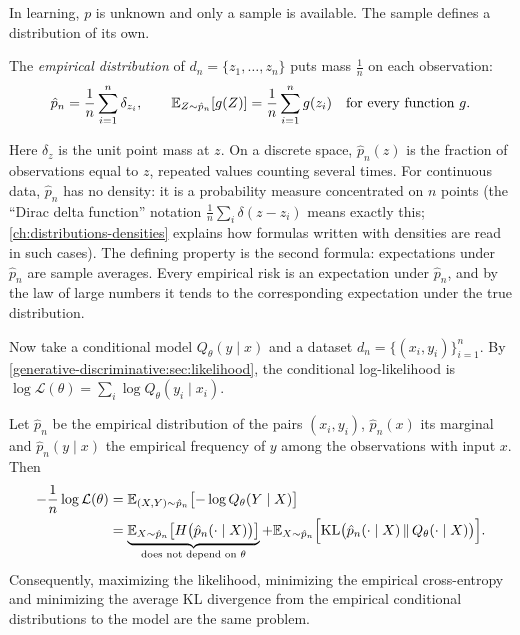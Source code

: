 \begin{notechapter}
In learning, $p$ is unknown and only a sample is available. The sample defines a
distribution of its own.

\begin{definition}\label{cross-entropy:def:empirical}
The \emph{empirical distribution} of $d_n = \{z_1,\dots,z_n\}$ puts mass $\frac1n$ on
each observation:
\[
  \hat p_n = \frac1n\sum_{i=1}^n\delta_{z_i},\qquad
  \mathbb{E}_{Z\sim\hat p_n}[g(Z)] = \frac1n\sum_{i=1}^ng(z_i)\quad\text{for every function }g.
\]
\end{definition}

Here $\delta_z$ is the unit point mass at $z$. On a discrete space, $\hat p_n(z)$ is
the fraction of observations equal to $z$, repeated values counting several times.
For continuous data, $\hat p_n$ has no density: it is a probability measure
concentrated on $n$ points (the ``Dirac delta function'' notation
$\frac1n\sum_i\delta(z - z_i)$ means exactly this; \cref{ch:distributions-densities} explains how
formulas written with densities are read in such cases). The defining property is the
second formula: expectations under $\hat p_n$ are sample averages. Every empirical
risk is an expectation under $\hat p_n$, and by the law of large numbers it tends
to the corresponding expectation under the true distribution.

Now take a conditional model $Q_\theta(y\mid x)$ and a dataset
$d_n = \{(x_i,y_i)\}_{i=1}^n$. By \cref{generative-discriminative:sec:likelihood}, the
conditional log-likelihood is $\log\mathcal L(\theta) = \sum_i\log Q_\theta(y_i\mid x_i)$.

\begin{theorem}\label{cross-entropy:thm:mle}
Let $\hat p_n$ be the empirical distribution of the pairs $(x_i,y_i)$, $\hat p_n(x)$ its
marginal and $\hat p_n(y\mid x)$ the empirical frequency of $y$ among the observations
with input $x$. Then
\begin{align*}
  -\frac1n\log\mathcal L(\theta)
  &= \mathbb{E}_{(X,Y)\sim\hat p_n}\bigl[-\log Q_\theta(Y\mid X)\bigr]\\
  &= \underbrace{\mathbb{E}_{X\sim\hat p_n}\bigl[H\bigl(\hat p_n(\cdot\mid X)\bigr)\bigr]}_{\text{does not depend on }\theta}
  + \mathbb{E}_{X\sim\hat p_n}\Bigl[\mathrm{KL}\bigl(\hat p_n(\cdot\mid X)\,\Vert\,Q_\theta(\cdot\mid X)\bigr)\Bigr].
\end{align*}
Consequently, maximizing the likelihood, minimizing the empirical cross-entropy
and minimizing the average KL divergence from the empirical conditional
distributions to the model are the same problem.
\end{theorem}


\end{notechapter}
